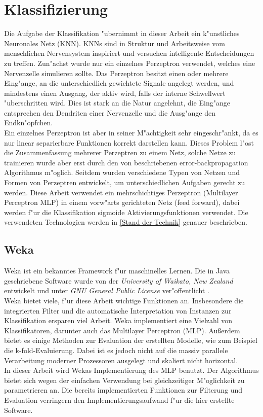 \section{Klassifizierung}
\label{Klassifizierung}
Die Aufgabe der Klassifikation "ubernimmt in dieser Arbeit ein k"unstliches Neuronales Netz (KNN). KNNs sind in Struktur und Arbeitsweise vom menschlichen Nervensystem inspiriert \cite{kruse2011computational} und versuchen intelligente Entscheidungen zu treffen. Zun"achst wurde nur ein einzelnes Perzeptron verwendet, welches eine Nervenzelle simulieren sollte. Das Perzeptron besitzt einen oder mehrere Eing"ange, an die unterschiedlich gewichtete Signale angelegt werden, und mindestens einen Ausgang, der aktiv wird, falls der interne Schwellwert "uberschritten wird. Dies ist stark an die Natur angelehnt, die Eing"ange entsprechen den Dendriten einer Nervenzelle und die Ausg"ange den Endkn"opfchen\cite{kruse2011computational}. \\
Ein einzelnes Perzeptron ist aber in seiner M"achtigkeit sehr eingeschr"ankt, da es nur linear separierbare Funktionen korrekt darstellen kann. Dieses Problem l"ost die Zusammenfassung mehrerer Perzeptren zu einem Netz, solche Netze zu trainieren wurde aber erst durch den von \cite{werbos1974beyond} beschriebenen error-backpropagation Algorithmus m"oglich. Seitdem wurden verschiedene Typen von Netzen und Formen von Perzeptren entwickelt, um unterschiedlichen Aufgaben gerecht zu werden. Diese Arbeit verwendet ein mehrschichtiges Perzeptron (Multilayer Perceptron MLP) in einem vorw"arts gerichteten Netz (feed forward), dabei werden f"ur die Klassifikation sigmoide Aktivierungsfunktionen verwendet. Die verwendeten Technologien werden in \ref{Stand der Technik} genauer beschrieben.


\subsection{Weka}
\label{Weka}
Weka ist ein bekanntes Framework f"ur maschinelles Lernen. Die in Java geschriebene Software wurde von der \textit{University of Waikato, New Zealand} entwickelt und unter \textit{GNU General Public License} ver"offentlicht \cite{WekaHaupt}. \\
Weka bietet viele, f"ur diese Arbeit wichtige Funktionen an. Insbesondere die integrierten Filter und die automatische Interpretation von Instanzen zur Klassifikation ersparen viel Arbeit. Weka implementiert eine Vielzahl von Klassifikatoren, darunter auch das Multilayer Perceptron (MLP).
Au{\ss}erdem bietet es einige Methoden zur Evaluation der erstellten Modelle, wie zum Beispiel die k-fold-Evaluierung. Dabei ist es jedoch nicht auf die massiv parallele Verarbeitung moderner Prozessoren ausgelegt und skaliert nicht horizontal.\\
In dieser Arbeit wird Wekas Implementierung des MLP benutzt. Der Algorithmus bietet sich wegen der einfachen Verwendung bei gleichzeitiger M"oglichkeit zu parametrieren an. Die bereits implementierten  Funktionen zur Filterung und Evaluation verringern den Implementierungsaufwand f"ur die hier erstellte Software.

